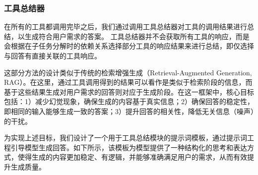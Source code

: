 \subsubsection{工具总结器}

在所有的工具都调用完毕之后，我们通过调用工具总结器对工具的调用结果进行总结，以生成符合用户需求的答案。
工具总结器并不会获取所有工具的响应，而是会根据在子任务分解时的依赖关系选择部分工具的响应结果来进行总结，即仅选择与回答有直接关联的工具响应。


这部分方法的设计类似于传统的检索增强生成（Retrieval-Augmented Generation, RAG）。在这里，通过工具调用得到的结果可以看作是类似于检索阶段的信息，而基于这些结果生成对用户需求的回答则对应于生成阶段。在这一框架中，核心目标包括：1）减少幻觉现象，确保生成的内容基于真实信息；2）确保回答的稳定性，即相同的输入能够生成一致的答案；3）提升回答的相关性，降低无关信息（噪声）的干扰。

为实现上述目标，我们设计了一个用于工具总结模块的提示词模板，通过提示词工程引导模型生成回答。如下所示，该模板为模型提供了一种结构化的思考和表达方式，使得生成的内容更加稳定、有逻辑，并能够准确满足用户的需求，从而有效提升生成质量。


